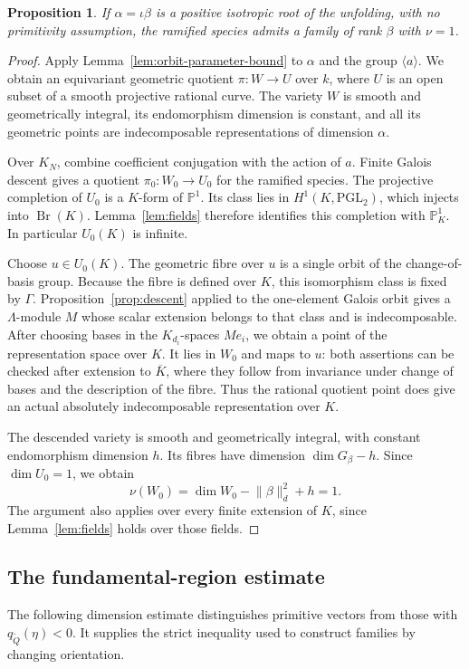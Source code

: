 \documentclass[11pt, reqno]{amsart}
\numberwithin{equation}{section}
\newtheorem{proposition}[theorem]{Proposition}
\theoremstyle{definition}
\theoremstyle{remark}
\newcommand{\op}[1]{\operatorname{#1}}
\newcommand{\mr}[1]{\mathrm{#1}}
\newcommand{\mb}[1]{\mathbb{#1}}
\newcommand{\Br}{\op{Br}}
\newcommand{\Qbar}{\widetilde Q}
\begin{document}
\begin{proposition}\label{prop:isotropic-absolute}
If $\alpha=\iota\beta$ is a positive isotropic root of the
unfolding, with no primitivity assumption, the ramified species
admits a family of rank $\beta$ with $\nu=1$.
\end{proposition}
\begin{proof}
Apply Lemma~\ref{lem:orbit-parameter-bound} to $\alpha$ and the group
$\langle a\rangle$. We obtain an equivariant geometric quotient
$\pi:W\to U$ over $k$, where $U$ is an open subset of a smooth
projective rational curve. The variety $W$ is smooth and geometrically
integral, its endomorphism dimension is constant, and all its geometric
points are indecomposable representations of dimension $\alpha$.

Over $K_N$, combine coefficient conjugation with the action of $a$.
Finite Galois descent gives a quotient $\pi_0:W_0\to U_0$ for the
ramified species. The projective completion of $U_0$ is a $K$-form of
$\mb P^1$. Its class lies in $H^1(K,\mr{PGL}_2)$, which injects
into $\Br(K)$. Lemma~\ref{lem:fields} therefore identifies this
completion with $\mb P^1_K$. In particular $U_0(K)$ is infinite.

Choose $u\in U_0(K)$. The geometric fibre over $u$ is a single orbit
of the change-of-basis group. Because the fibre is defined over $K$,
this isomorphism class is fixed by $\Gamma$. Proposition~\ref{prop:descent}
applied to the one-element Galois orbit gives a $\Lambda$-module $M$
whose scalar extension belongs to that class and is indecomposable.
After choosing bases in the $K_{d_i}$-spaces $Me_i$, we obtain a point
of the representation space over $K$. It lies in $W_0$ and maps to $u$:
both assertions can be checked after extension to $\overline K$, where
they follow from invariance under change of bases and the description
of the fibre. Thus the rational quotient point does give an actual
absolutely indecomposable representation over $K$.

The descended variety is smooth and geometrically integral, with
constant endomorphism dimension $h$. Its fibres have dimension
$\dim G_\beta-h$. Since $\dim U_0=1$, we obtain
\[ \nu(W_0)=\dim W_0-\lVert\beta\rVert_d^2+h=1. \]
The argument also applies over every finite extension of $K$, since
Lemma~\ref{lem:fields} holds over those fields.
\end{proof}


\subsection{The fundamental-region estimate}
The following dimension estimate distinguishes primitive vectors
from those with $q_{\Qbar}(\eta)<0$. It supplies the strict
inequality used to construct families by changing orientation.
\end{document}
